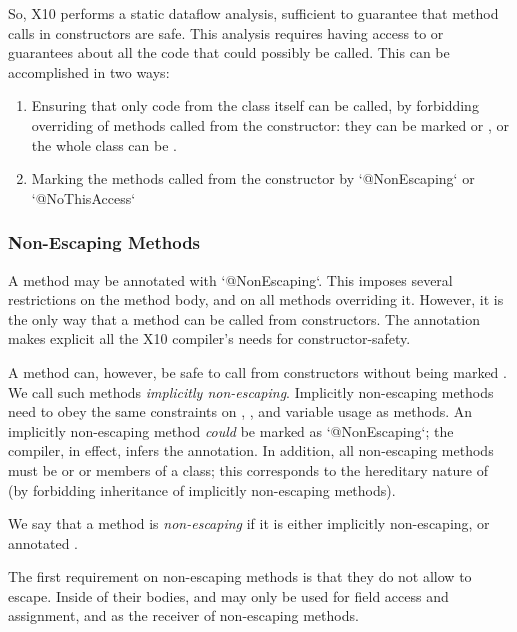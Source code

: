 So, X10 performs a static dataflow analysis, sufficient to guarantee that
method calls in constructors are safe.  This analysis requires having access
to or guarantees about all the code that could possibly be called.  This can
be accomplished in two ways:
\begin{enumerate}
\item Ensuring that only code from the class itself can be called, by
      forbidding overriding of
      methods called from the constructor: they can be marked  or
      , or the whole class can be .
\item Marking the methods called from the constructor by
      \xcd`@NonEscaping` or \xcd`@NoThisAccess`
\end{enumerate}

\subsubsection{Non-Escaping Methods}


A method may be annotated with \xcd`@NonEscaping`.  This
imposes several restrictions on the method body, and on all methods overriding
it.  However, it is the only way that a method can be called from
constructors.  The
 annotation makes explicit all the X10 compiler's needs for
constructor-safety.

A method can, however, be safe to call from constructors without being marked
. We call such methods {\em implicitly non-escaping}.
Implicitly non-escaping methods need to obey the same constraints on
, , and variable usage as  methods. An
implicitly non-escaping method {\em could} be marked as
\xcd`@NonEscaping`; the compiler, in
effect, infers the annotation. In addition, all non-escaping methods
must be  or  or members of a  class; this
corresponds to the hereditary nature of  (by forbidding
inheritance of implicitly non-escaping methods).

We say that a method is {\em non-escaping} if it is either implicitly
non-escaping, or annotated .

The first requirement on non-escaping methods is that they do not allow
 to escape. Inside of their bodies,  and  may
only be used for field access and assignment, and as the receiver of
non-escaping methods.


